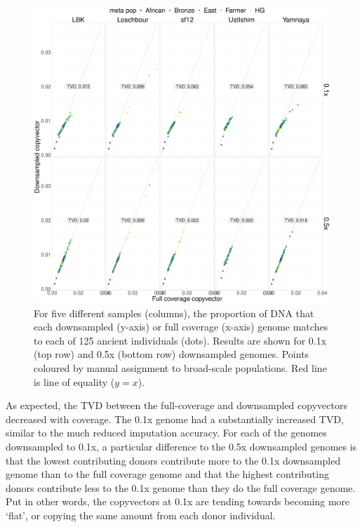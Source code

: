 \begin{figure}[htp]
    \centering
    \includegraphics[width=1.0\textwidth]{../images/chapter1/CP_correlation_allSamples_0.1x_0.5x_30x.pdf}
    \caption{For five different samples (columns), the proportion of DNA that each downsampled (y-axis) or full coverage (x-axis) genome matches to each of 125 ancient individuals (dots). Results are shown for 0.1x (top row) and 0.5x (bottom row) downsampled genomes. Points coloured by manual assignment to broad-scale populations. Red line is line of equality ($y=x$).}
    \label{fig:CP_correlation_allSamples_0.1x_0.5x_30x}
\end{figure}

As expected, the TVD between the full-coverage and downsampled copyvectors decreased with coverage. The 0.1x genome had a substantially increased TVD, similar to the much reduced imputation accuracy. For each of the genomes downsampled to 0.1x, a particular difference to the 0.5x downsampled genomes is that the lowest contributing donors contribute more to the 0.1x downsampled genome than to the full coverage genome and that the highest contributing donors contribute less to the 0.1x genome than they do the full coverage genome. Put in other words, the copyvectors at 0.1x are tending towards becoming more `flat', or copying the same amount from each donor individual. 

